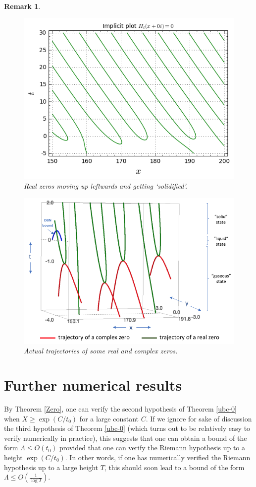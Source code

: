 \documentclass[a4paper,11pt,twoside]{amsart}
\newtheorem{remark}[theorem]{Remark}
\begin{document}
\begin{remark}
\begin{figure}[ht!]
  \includegraphics[width=0.9\linewidth]{Real_zeros_solid.png}
  \caption{Real zeros moving up leftwards and getting `solidified'.}
\end{figure}

\begin{figure}[ht!]
  \includegraphics[width=0.9\linewidth]{Actual_trajectories_zeros.png}
  \caption{Actual trajectories of some real and complex zeros.}
\end{figure}

\end{remark}


\section{Further numerical results}\label{further-sec}

By Theorem \ref{Zero}, one can verify the second hypothesis of Theorem \ref{ubc-0} when $X \geq \exp(C/t_0)$ for a large constant $C$.  If we ignore for sake of discussion the third hypothesis of Theorem \ref{ubc-0} (which turns out to be relatively easy to verify numerically in practice), this suggests that one can obtain a bound of the form $\Lambda \leq O(t_0)$ provided that one can verify the Riemann hypothesis up to a height $\exp(C/t_0)$.  In other words, if one has numerically verified the Riemann hypothesis up to a large height $T$, this should soon lead to a bound of the form $\Lambda \leq O \left( \frac{1}{\log T} \right )$.
\end{document}
